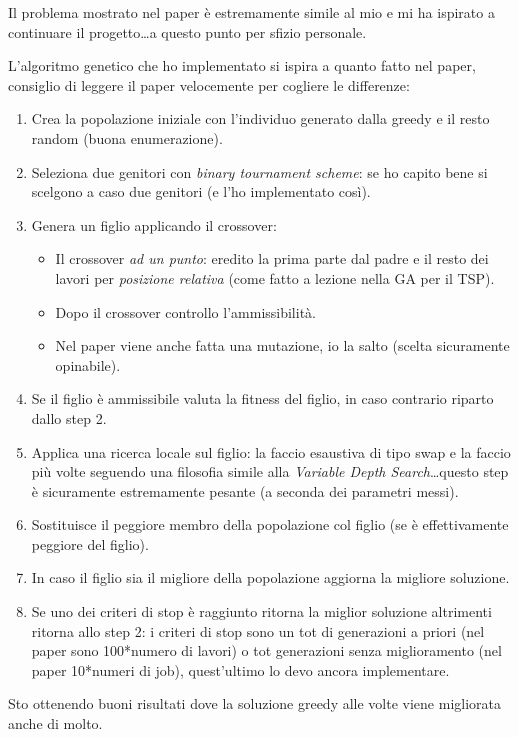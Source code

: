\documentclass[12pt, letterpaper]{article}
\begin{document}
Il problema mostrato nel paper è estremamente simile al mio e mi ha ispirato a continuare il progetto\ldots a questo punto per sfizio personale.

L'algoritmo genetico che ho implementato si ispira a quanto fatto nel paper, consiglio di leggere il paper velocemente per cogliere le differenze: 

\begin{enumerate}
\item{Crea la popolazione iniziale con l'individuo generato dalla greedy e il resto random (buona enumerazione).}
\item{Seleziona due genitori con \textit{binary tournament scheme}: se ho capito bene si scelgono a caso due genitori (e l'ho implementato così).}
\item{Genera un figlio applicando il crossover:}
\begin{itemize}
\item{Il crossover \textit{ad un punto}: eredito la prima parte dal padre e il resto dei lavori per \textit{posizione relativa} (come fatto a lezione nella GA per il TSP).}
\item{Dopo il crossover controllo l'ammissibilità.}
\item{Nel paper viene anche fatta una mutazione, io la salto (scelta sicuramente opinabile).}
\end{itemize}
\item{Se il figlio è ammissibile valuta la fitness del figlio, in caso contrario riparto dallo step 2.}
\item{Applica una ricerca locale sul figlio: la faccio esaustiva di tipo swap e la faccio più volte seguendo una filosofia simile alla \textit{Variable Depth Search}\ldots questo step è sicuramente estremamente pesante (a seconda dei parametri messi).}
\item{Sostituisce il peggiore membro della popolazione col figlio (se è effettivamente peggiore del figlio).}
\item{In caso il figlio sia il migliore della popolazione aggiorna la migliore soluzione.}
\item{Se uno dei criteri di stop è raggiunto ritorna la miglior soluzione altrimenti ritorna allo step 2: i criteri di stop sono un tot di generazioni a priori (nel paper sono 100*numero di lavori) o tot generazioni senza miglioramento (nel paper 10*numeri di job), quest'ultimo lo devo ancora implementare.}
\end{enumerate}

Sto ottenendo buoni risultati dove la soluzione greedy alle volte viene migliorata anche di molto.
\end{document}
